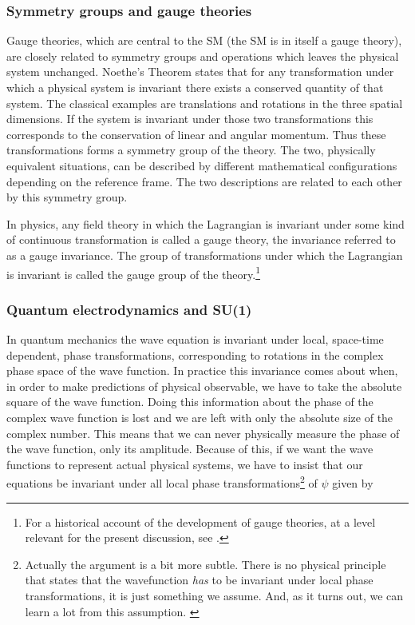 \subsubsection{Symmetry groups and gauge theories}
Gauge theories, which are central to the SM (the SM is in itself a gauge theory), are closely related to symmetry groups and operations which leaves the physical system unchanged. Noethe's Theorem states that for any transformation under which a physical system is invariant there exists a conserved quantity of that system. The classical examples are translations and rotations in the three spatial dimensions. If the system is invariant under those two transformations this corresponds to the conservation of linear and angular momentum. Thus these transformations forms a symmetry group of the theory. The two, physically equivalent situations, can be described by different mathematical configurations depending on the reference frame. The two descriptions are related to each other by this symmetry group.

In physics, any field theory in which the Lagrangian is invariant under some kind of continuous transformation is called a gauge theory, the invariance referred to as a gauge invariance. The group of transformations under which the Lagrangian is invariant is called the gauge group of the theory.\footnote{For a historical account of the development of gauge theories, at a level relevant for the present discussion, see \cite{gross1992gtp}.}

\subsubsection{Quantum electrodynamics and SU(1)}
In quantum mechanics the wave equation is invariant under local, space-time dependent, phase transformations, corresponding to rotations in the complex phase space of the wave function. In practice this invariance comes about when, in order to make predictions of physical observable, we have to take the absolute square of the wave function. Doing this information about the phase of the complex wave function is lost and we are left with only the absolute size of the complex number. This means that we can never physically measure the phase of the wave function, only its amplitude. Because of this, if we want the wave functions to represent actual physical systems, we have to insist that our equations be invariant under all local phase transformations\footnote{Actually the argument is a bit more subtle. There is no physical principle that states that the wavefunction \emph{has} to be invariant under local phase transformations, it is just something we assume. And, as it turns out, we can learn a lot from this assumption. \cite{griffiths1987iep}} of $\psi$ given by

